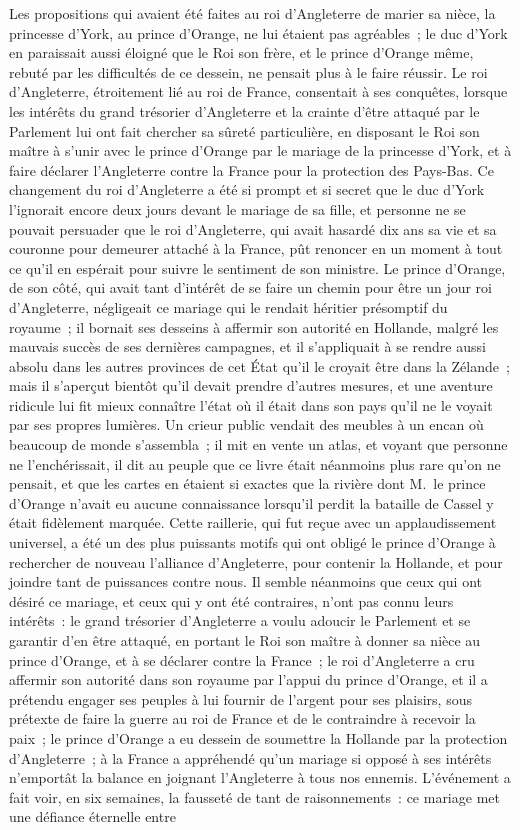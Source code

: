 \documentclass[french,twoside]{book} %
\begin{document}
Les propositions qui avaient été faites au roi d’Angleterre de marier sa nièce, la princesse d’York, au prince d’Orange, ne lui étaient pas agréables ; le duc d’York en paraissait aussi éloigné que le Roi son frère, et le prince d’Orange même, rebuté par les difficultés de ce dessein, ne pensait plus à le faire réussir. Le roi d’Angleterre, étroitement lié au roi de France, consentait à ses conquêtes, lorsque les intérêts du grand trésorier d’Angleterre et la crainte d’être attaqué par le Parlement lui ont fait chercher sa sûreté particulière, en disposant le Roi son maître à s’unir avec le prince d’Orange par le mariage de la princesse d’York, et à faire déclarer l’Angleterre contre la France pour la protection des Pays-Bas. Ce changement du roi d’Angleterre a été si prompt et si secret que le duc d’York l’ignorait encore deux jours devant le mariage de sa fille, et personne ne se pouvait persuader que le roi d’Angleterre, qui avait hasardé dix ans sa vie et sa couronne pour demeurer attaché à la France, pût renoncer en un moment à tout ce qu’il en espérait pour suivre le sentiment de son ministre. Le prince d’Orange, de son côté, qui avait tant d’intérêt de se faire un chemin pour être un jour roi d’Angleterre, négligeait ce mariage qui le rendait héritier présomptif du royaume ; il bornait ses desseins à affermir son autorité en Hollande, malgré les mauvais succès de ses dernières campagnes, et il s’appliquait à se rendre aussi absolu dans les autres provinces de cet État qu’il le croyait être dans la Zélande ; mais il s’aperçut bientôt qu’il devait prendre d’autres mesures, et une aventure ridicule lui fit mieux connaître l’état où il était dans son pays qu’il ne le voyait par ses propres lumières. Un crieur public vendait des meubles à un encan où beaucoup de monde s’assembla ; il mit en vente un atlas, et voyant que personne ne l’enchérissait, il dit au peuple que ce livre était néanmoins plus rare qu’on ne pensait, et que les cartes en étaient si exactes que la rivière dont M. le prince d’Orange n’avait eu aucune connaissance lorsqu’il perdit la bataille de Cassel y était fidèlement marquée. Cette raillerie, qui fut reçue avec un applaudissement universel, a été un des plus puissants motifs qui ont obligé le prince d’Orange à rechercher de nouveau l’alliance d’Angleterre, pour contenir la Hollande, et pour joindre tant de puissances contre nous. Il semble néanmoins que ceux qui ont désiré ce mariage, et ceux qui y ont été contraires, n’ont pas connu leurs intérêts : le grand trésorier d’Angleterre a voulu adoucir le Parlement et se garantir d’en être attaqué, en portant le Roi son maître à donner sa nièce au prince d’Orange, et à se déclarer contre la France ; le roi d’Angleterre a cru affermir son autorité dans son royaume par l’appui du prince d’Orange, et il a prétendu engager ses peuples à lui fournir de l’argent pour ses plaisirs, sous prétexte de faire la guerre au roi de France et de le contraindre à recevoir la paix ; le prince d’Orange a eu dessein de soumettre la Hollande par la protection d’Angleterre ; à la France a appréhendé qu’un mariage si opposé à ses intérêts n’emportât la balance en joignant l’Angleterre à tous nos ennemis. L’événement a fait voir, en six semaines, la fausseté de tant de raisonnements : ce mariage met une défiance éternelle entre 
\end{document}
